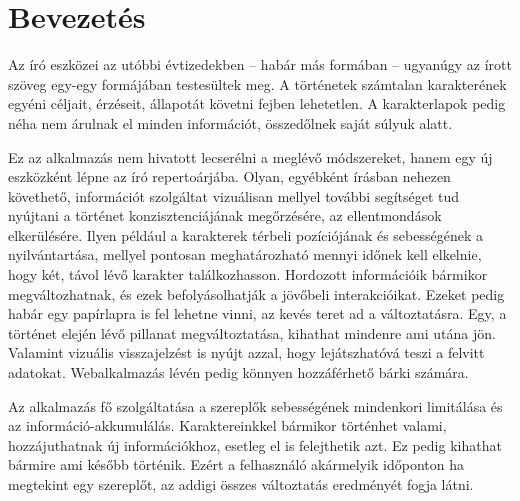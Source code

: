\chapter{Bevezetés}
\label{ch:intro}

Az író eszközei az utóbbi évtizedekben -- habár más formában -- ugyanúgy az írott szöveg egy-egy formájában testesültek meg. A történetek számtalan karakterének egyéni céljait, érzéseit, állapotát követni fejben lehetetlen. A karakterlapok pedig néha nem árulnak el minden információt, összedőlnek saját súlyuk alatt.

Ez az alkalmazás nem hivatott lecserélni a meglévő módszereket, hanem egy új eszközként lépne az író repertoárjába. Olyan, egyébként írásban nehezen követhető, információt szolgáltat vizuálisan mellyel további segítséget tud nyújtani a történet konzisztenciájának megőrzésére, az ellentmondások elkerülésére. Ilyen például a karakterek térbeli pozíciójának és sebességének a nyilvántartása, mellyel pontosan meghatározható mennyi időnek kell elkelnie, hogy két, távol lévő karakter találkozhasson. Hordozott információik bármikor megváltozhatnak, és ezek befolyásolhatják a jövőbeli interakcióikat. Ezeket pedig habár egy papírlapra is fel lehetne vinni, az kevés teret ad a változtatásra. Egy, a történet elején lévő pillanat megváltoztatása, kihathat mindenre ami utána jön. Valamint vizuális visszajelzést is nyújt azzal, hogy lejátszhatóvá teszi a felvitt adatokat. Webalkalmazás lévén pedig könnyen hozzáférhető bárki számára.

Az alkalmazás fő szolgáltatása a szereplők sebességének mindenkori limitálása és az információ-akkumulálás. Karaktereinkkel bármikor történhet valami, hozzájuthatnak új információkhoz, esetleg el is felejthetik azt. Ez pedig kihathat bármire ami később történik. Ezért a felhasználó akármelyik időponton ha megtekint egy szereplőt, az addigi összes változtatás eredményét fogja látni.
